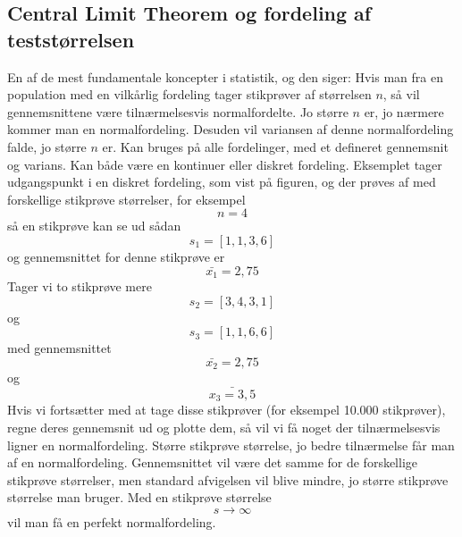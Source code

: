 \documentclass[11pt]{article}
\begin{document}
\subsection{Central Limit Theorem og fordeling af teststørrelsen}
En af de mest fundamentale koncepter i statistik, og den siger: Hvis man fra en population med en vilkårlig fordeling tager stikprøver af størrelsen $n$, så vil gennemsnittene være tilnærmelsesvis normalfordelte. Jo større $n$ er, jo nærmere kommer man en normalfordeling. Desuden vil variansen af denne normalfordeling falde, jo større $n$ er. Kan bruges på alle fordelinger, med et defineret gennemsnit og varians. Kan både være en kontinuer eller diskret fordeling. Eksemplet tager udgangspunkt i en diskret fordeling, som vist på figuren, og der prøves af med forskellige stikprøve størrelser, for eksempel 
$$n=4$$
så en stikprøve kan se ud sådan
$$s_1=[1,1,3,6]$$
og gennemsnittet for denne stikprøve er 
$$\bar{x_1}=2,75$$
Tager vi to stikprøve mere
$$s_2=[3,4,3,1]$$
og
$$s_3=[1,1,6,6]$$
med gennemsnittet
$$\bar{x_2}=2,75$$
og
$$\bar{x_3=3,5}$$
Hvis vi fortsætter med at tage disse stikprøver (for eksempel 10.000 stikprøver), regne deres gennemsnit ud og plotte dem, så vil vi få noget der tilnærmelsesvis ligner en normalfordeling. Større stikprøve størrelse, jo bedre tilnærmelse får man af en normalfordeling. Gennemsnittet vil være det samme for de forskellige stikprøve størrelser, men standard afvigelsen vil blive mindre, jo større stikprøve størrelse man bruger. Med en stikprøve størrelse
$$s\longrightarrow \infty$$
vil man få en perfekt normalfordeling.
\end{document}
